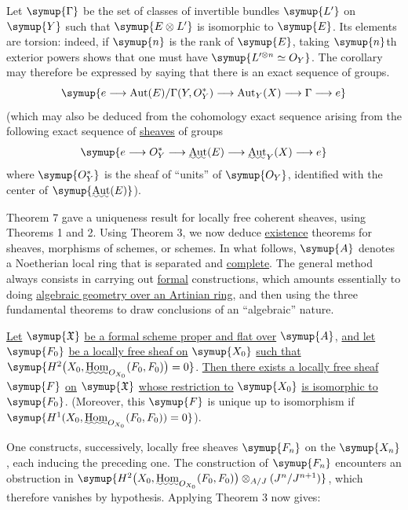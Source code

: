 Let $\symup{\Gamma}$ be the set of classes of invertible bundles $\symup{L'}$ on $\symup{Y}$ such that
$\symup{E\otimes L'}$ is isomorphic to $\symup{E}$. Its elements are torsion: indeed, if $\symup{n}$
is the rank of $\symup{E}$, taking $\symup{n}$th exterior powers shows that one must have
$\symup{L'^{\otimes n}\simeq O_Y}$. The corollary may therefore be expressed by
saying that there is an exact sequence of groups.
\[
  \symup{e\longrightarrow
  \operatorname{Aut}(E)/\Gamma(Y,O_Y^*)
  \longrightarrow \operatorname{Aut}_Y(X)
  \longrightarrow \Gamma\longrightarrow e}
\]
(which may also be deduced from the cohomology exact sequence arising from the
following exact sequence of \uline{sheaves} of groups
\[
  \symup{e\longrightarrow O_Y^*
  \longrightarrow \mathop{\text{\uwave{Aut}}}\nolimits(E)
  \longrightarrow \mathop{\text{\uwave{Aut}}}\nolimits_Y(X)
  \longrightarrow e}
\]
where $\symup{O_Y^*}$ is the sheaf of “units” of $\symup{O_Y}$, identified with the
center of $\symup{\mathop{\text{\uwave{Aut}}}\nolimits(E)}$).



Theorem 7 gave a uniqueness result for locally free coherent sheaves, using
Theorems 1 and 2. Using Theorem 3, we now deduce \uline{existence} theorems for
sheaves, morphisms of schemes, or schemes. In what follows, $\symup{A}$ denotes a
Noetherian local ring that is separated and \uline{complete}. The general method
always consists in carrying out \uline{formal} constructions, which amounts
essentially to doing \uline{algebraic geometry over an Artinian ring}, and then using
the three fundamental theorems to draw conclusions of an “algebraic” nature.

 \uline{Let} $\symup{\mathfrak X}$ \uline{be a formal scheme proper and flat
over} $\symup{A}$, \uline{and let} $\symup{F_0}$ \uline{be a locally free sheaf on} $\symup{X_0}$ \uline{such that}
$\symup{H^2\bigl(X_0,\mathop{\text{\uwave{Hom}}}\nolimits_{O_{X_0}}(F_0,F_0)\bigr)=0}$.
\uline{Then there exists a locally free sheaf} $\symup{F}$ \uline{on} $\symup{\mathfrak X}$ \uline{whose restriction
to} $\symup{X_0}$ \uline{is isomorphic to} $\symup{F_0}$. (Moreover, this $\symup{F}$ is unique up to
isomorphism if
$\symup{H^1(X_0,\mathop{\text{\uwave{Hom}}}\nolimits_{O_{X_0}}(F_0,F_0))=0}$).

One constructs, successively, locally free sheaves $\symup{F_n}$ on the $\symup{X_n}$, each
inducing the preceding one. The construction of $\symup{F_n}$ encounters an
obstruction in
$\symup{H^2\bigl(X_0,\mathop{\text{\uwave{Hom}}}\nolimits_{O_{X_0}}(F_0,F_0)\bigr) \otimes_{A/J}(J^n/J^{n+1})}$,
which therefore vanishes by hypothesis. Applying Theorem 3 now gives:

